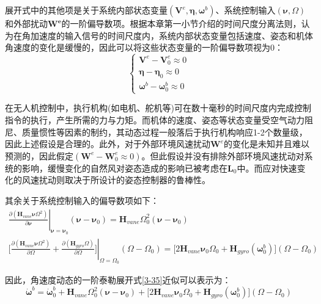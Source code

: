 展开式中的其他项是关于系统内部状态变量$(\boldsymbol{V}^e,\boldsymbol{\eta},\boldsymbol{\omega}^b)$、系统控制输入$(\boldsymbol{\nu},\Omega)$和外部扰动$\boldsymbol{W^e}$的一阶偏导数项。根据本章第一小节介绍的时间尺度分离法则，认为在角加速度的输入信号的时间尺度内，系统内部状态变量包括速度、姿态和机体角速度的变化是缓慢的，因此可以将这些状态变量的一阶偏导数项视为0：
\begin{equation}
    \begin{cases}
        \boldsymbol{V}^e-\boldsymbol{V}_0^e\approx0 \\
        \boldsymbol{\eta}-\boldsymbol{\eta}_0\approx0 \\
        \boldsymbol{\omega}^b-\boldsymbol{\omega}_0^b\approx0
    \end{cases}
    \label{3-37}
\end{equation}

在无人机控制中，执行机构(如电机、舵机等)可在数十毫秒的时间尺度内完成控制指令的执行，产生所需的力与力矩。而机体的速度、姿态等状态变量受空气动力阻尼、质量惯性等因素的制约，其动态过程一般落后于执行机构响应1-2个数量级，因此上述假设是合理的。此外，对于外部环境风速扰动$\boldsymbol{W}^e$的变化是未知并且难以预测的，因此假定$(\boldsymbol{W}^e-\boldsymbol{W}_0^e\approx0)$。但此假设并没有排除外部环境风速扰动对系统的影响，缓慢变化的自然风对姿态造成的影响已被考虑在$\boldsymbol{L}_0$中。而应对快速变化的风速扰动则取决于所设计的姿态控制器的鲁棒性。

其余关于系统控制输入的偏导数项如下：
\begin{equation}
    \begin{gathered}
    \left.\frac{\partial(\boldsymbol{H}_{vane}\boldsymbol{\nu}\Omega^2)}{\partial\boldsymbol{\nu}}\right|_{\boldsymbol{\nu}=\boldsymbol{\nu}_0}(\boldsymbol{\nu}-\boldsymbol{\nu}_0)=\boldsymbol{H}_{vane}\Omega_0^2(\boldsymbol{\nu}-\boldsymbol{\nu}_0) \\
    \left.\bigg[\frac{\partial(\boldsymbol{H}_{vane}\boldsymbol{\nu}\Omega^2)}{\partial\Omega}+\frac{\partial(\boldsymbol{H}_{gyro}\Omega)}{\partial\Omega}\bigg]\right|_{\Omega=\Omega_0}(\Omega-\Omega_0)=\big[2\boldsymbol{H}_{vane}\boldsymbol{\nu}_0\Omega_0+\boldsymbol{H}_{gyro}(\boldsymbol{\omega}_0^b)\big](\Omega-\Omega_0)
    \end{gathered}
    \label{3-38}
\end{equation}

因此，角速度动态的一阶泰勒展开式\eqref{3-35}近似可以表示为：
\begin{equation}
    \boldsymbol{\dot{\omega}}^b=\boldsymbol{\dot{\omega}}_0^b+\boldsymbol{H}_{vane}\Omega_0^2(\boldsymbol{\nu}-\boldsymbol{\nu}_0)+\big[2\boldsymbol{H}_{vane}\boldsymbol{\nu}_0\Omega_0+\boldsymbol{H}_{gyro}(\boldsymbol{\omega}_0^b)\big](\Omega-\Omega_0)
    \label{3-39}
\end{equation}

